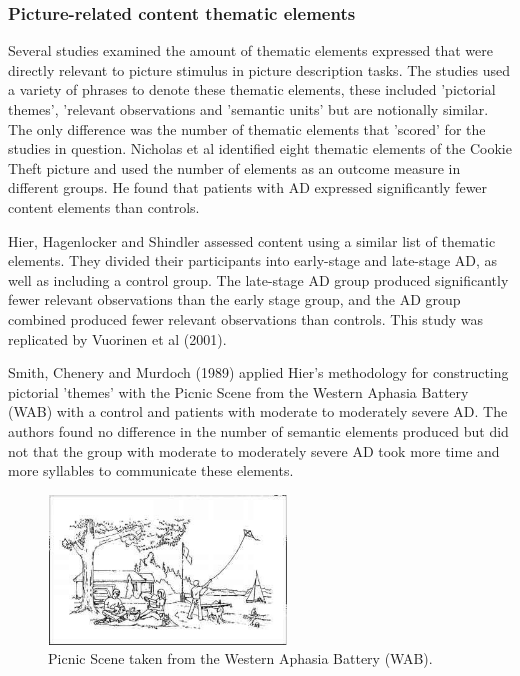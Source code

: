 \documentclass{article}
\begin{document}
\subsubsection{Picture-related content thematic elements}
Several studies examined the amount of thematic elements expressed that were directly relevant to picture stimulus in picture description tasks. The studies used a variety of phrases to denote these thematic elements, these included 'pictorial themes', 'relevant observations and 'semantic units' but are notionally similar. The only difference was the number of thematic elements that 'scored' for the studies in question. Nicholas et al identified eight thematic elements of the Cookie Theft picture and used the number of elements as an outcome measure in different groups. He found that patients with AD expressed significantly fewer content elements than controls. \newline
\par
Hier, Hagenlocker and Shindler assessed content using a similar list of thematic elements. They divided their participants into early-stage and late-stage AD, as well as including a control group. The late-stage AD group produced significantly fewer relevant observations than the early stage group, and the AD group combined produced fewer relevant observations than controls. This study was replicated by Vuorinen et al (2001). \newline
\par
Smith, Chenery and Murdoch (1989) applied Hier's methodology for constructing pictorial 'themes' with the Picnic Scene from the Western Aphasia Battery (WAB) with a control and patients with moderate to moderately severe AD. The authors found no difference in the number of semantic elements produced but did not that the group with moderate to moderately severe AD took more time and more syllables to communicate these elements. \newline
\par
\begin{figure}[H]
\centering
\includegraphics[width=240px, height=150px]{picnic-scene.jpg}
\caption{Picnic Scene taken from the Western Aphasia Battery (WAB).\label{white}}
\end{figure}
\end{document}
